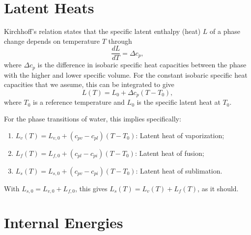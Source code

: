 \documentclass{report}
\begin{document}
\section{Latent Heats}

Kirchhoff's relation states that the specific latent enthalpy (heat) $L$ of a phase change depends on temperature $T$ through
\begin{equation}
    \frac{dL}{dT} = \Delta c_p,
\end{equation}
where $\Delta c_p$ is the difference in isobaric specific heat capacities between the phase with the higher and lower specific volume. For the constant isobaric specific heat capacities that we assume, this can be integrated to give
\begin{equation}
    L(T) = L_0 + \Delta c_p (T-T_0),
    \label{eq:LH_temperature}
\end{equation}
where $T_0$ is a reference temperature and $L_0$ is the specific latent heat at $T_0$. 

For the phase transitions of water, this implies specifically:
\begin{enumerate}
    \item $L_v(T) = L_{v,0} + (c_{pv} - c_{pl}) (T - T_0)$: Latent heat of vaporization;
    \item $L_f(T) = L_{f,0} + (c_{pl} - c_{pi}) (T - T_0)$: Latent heat of fusion;
    \item $L_s(T) = L_{s,0} + (c_{pv} - c_{pi}) (T - T_0)$: Latent heat of sublimation.
\end{enumerate}
With $L_{s,0} = L_{v,0} + L_{f,0}$, this gives $L_s(T) = L_v(T) + L_f(T)$, as it should.

\section{Internal Energies}\label{s:internal_energies}
\end{document}
